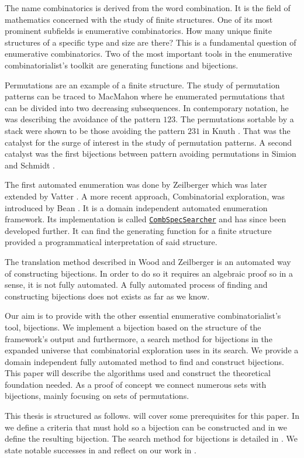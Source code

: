 \label{ch:introduction}
The name combinatorics is derived from the word combination. It is the field of mathematics concerned with the study of finite structures. One of its most prominent subfields is enumerative combinatorics. How many unique finite structures of a specific type and size are there? This is a fundamental question of enumerative combinatorics. Two of the most important tools in the enumerative combinatorialist's toolkit are generating functions and bijections.

Permutations are an example of a finite structure. The study of permutation patterns can be traced to MacMahon \cite{MacMahon} where he enumerated permutations that can be divided into two decreasing subsequences. In contemporary notation, he was describing the avoidance of the pattern $123$. The permutations sortable by a stack were shown to be those avoiding the pattern $231$ in Knuth \cite{knuth:aocp1}. That was the catalyst for the surge of interest in the study of permutation patterns. A second catalyst was the first bijections between pattern avoiding permutations in Simion and Schmidt \cite{simionandschmidt}. 

The first automated enumeration was done by Zeilberger \cite{Zeilberger1998EnumerationSA} which was later extended by Vatter \cite{vatter_2008}. A more recent approach, Combinatorial exploration, was introduced by Bean \cite{BeanPhd:phd}. It is a domain independent automated enumeration framework. Its implementation is called \href{https://github.com/PermutaTriangle/comb_spec_searcher}{\texttt{CombSpecSearcher}} and has since been developed further. It can find the generating function for a finite structure provided a programmatical interpretation of said structure.

The translation method described in Wood and Zeilberger \cite{wood_zeilberger} is an automated way of constructing bijections. In order to do so it requires an algebraic proof so in a sense, it is not fully automated. A fully automated process of finding and constructing bijections does not exists as far as we know.

Our aim is to provide \css{} with the other essential enumerative combinatorialist's tool, bijections. We implement a bijection based on the structure of the framework's output and furthermore, a search method for bijections in the expanded universe that combinatorial exploration uses in its search. We provide a domain independent fully automated method to find and construct bijections. This paper will describe the algorithms used and construct the theoretical foundation needed. As a proof of concept we connect numerous sets with bijections, mainly focusing on sets of permutations.

This thesis is structured as follows.  will cover some prerequisites for this paper. In  we define a criteria that must hold so a bijection can be constructed and in  we define the resulting bijection. The search method for bijections is detailed in . We state notable successes in  and reflect on our work in .
